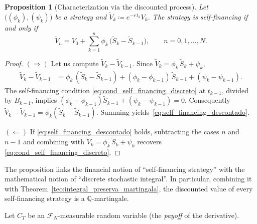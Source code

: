 \documentclass[11pt,a4paper,oneside]{report}
\theoremstyle{plain}
\newtheorem{proposicion}[teorema]{Proposition}
\theoremstyle{definition}
\theoremstyle{remark}
\newcommand{\Q}{\mathbb{Q}}
\newcommand{\F}{\mathcal{F}}
\newcommand{\1}{\mathbf{1}}
\newcommand{\eqdef}{\coloneqq}
\begin{document}
\begin{proposicion}[Characterization via the discounted process]
\label{prop:caracterizacion_self_financing}
Let $\bigl((\phi_k), (\psi_k)\bigr)$ be a strategy and
$\widetilde V_k \eqdef e^{-r\, t_k} V_k$. The strategy is
self-financing if and only if
\begin{equation}\label{eq:self_financing_descontado}
  \widetilde V_n = V_0 + \sum_{k=1}^{n} \phi_k\,
                   \bigl(\widetilde S_k - \widetilde S_{k-1}\bigr),
  \qquad n = 0, 1, \ldots, N.
\end{equation}
\end{proposicion}

\begin{proof}
$(\Rightarrow)$ Let us compute $\widetilde V_k - \widetilde V_{k-1}$.
Since $\widetilde V_k = \phi_k\, \widetilde S_k + \psi_k$,
\begin{align*}
  \widetilde V_k - \widetilde V_{k-1}
  &= \phi_k\, (\widetilde S_k - \widetilde S_{k-1})
   + (\phi_k - \phi_{k-1})\, \widetilde S_{k-1}
   + (\psi_k - \psi_{k-1}).
\end{align*}
The self-financing condition
\eqref{eq:cond_self_financing_discreto} at $t_{k-1}$, divided by
$B_{k-1}$, implies
$(\phi_k - \phi_{k-1}) \widetilde S_{k-1} + (\psi_k - \psi_{k-1}) = 0$.
Consequently
$\widetilde V_k - \widetilde V_{k-1} = \phi_k(\widetilde S_k - \widetilde S_{k-1})$.
Summing yields~\eqref{eq:self_financing_descontado}.

$(\Leftarrow)$ If \eqref{eq:self_financing_descontado} holds,
subtracting the cases $n$ and $n-1$ and combining with
$\widetilde V_k = \phi_k\, \widetilde S_k + \psi_k$ recovers
\eqref{eq:cond_self_financing_discreto}.
\end{proof}

The proposition links the financial notion of ``self-financing
strategy'' with the mathematical notion of ``discrete stochastic
integral''. In particular, combining it with
Theorem~\ref{teo:integral_preserva_martingala}, the discounted value
of every self-financing strategy is a $\Q$-martingale.

Let $C_T$ be an
$\F_N$-measurable random variable (the \emph{payoff} of the
derivative).
\end{document}
